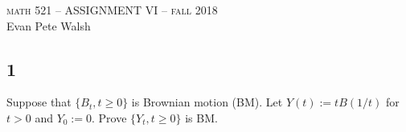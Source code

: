\documentclass[12pt]{article}
\begin{document}
\thispagestyle{empty}
\begin{center}
  \Large \textsc{math 521 -- ASSIGNMENT VI -- fall 2018} \\ 
  \vspace{5mm}
  \large Evan Pete Walsh
\end{center}


\subsection*{1}
\begin{tcolorbox}
  Suppose that $\{B_t, t \geq 0\}$ is Brownian motion (BM). Let $Y(t) := tB(1/t)$ for $t > 0$ and $Y_0 := 0$. Prove $\{ Y_t , t \geq 0 \}$ is BM.
\end{tcolorbox}
\end{document}
